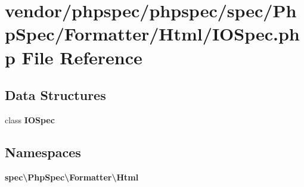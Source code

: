\section{vendor/phpspec/phpspec/spec/\+Php\+Spec/\+Formatter/\+Html/\+I\+O\+Spec.php File Reference}
\label{_formatter_2_html_2_i_o_spec_8php}
\subsection*{Data Structures}
\begin{DoxyCompactItemize}
\item 
class {\bf I\+O\+Spec}
\end{DoxyCompactItemize}
\subsection*{Namespaces}
\begin{DoxyCompactItemize}
\item 
 {\bf spec\textbackslash{}\+Php\+Spec\textbackslash{}\+Formatter\textbackslash{}\+Html}
\end{DoxyCompactItemize}
